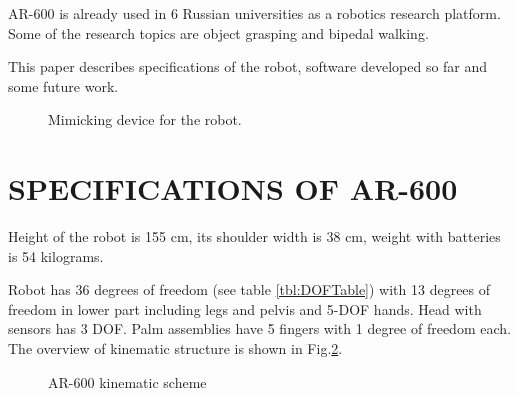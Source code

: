 \documentclass[letterpaper, 10 pt, conference]{ieeeconf}  %
\begin{document}
AR-600 is already used in 6 Russian universities as a robotics research
platform. Some of the research topics are object grasping and bipedal walking.

This paper describes specifications of the robot, software developed so far and
some future work.

\begin{figure} [thpb]
      \centering
      \caption{Mimicking device for the robot.}
      \label{img:suit}
\end{figure}

\section{SPECIFICATIONS OF AR-600}

Height of the robot is 155 cm, its shoulder width is 38 cm, weight with
batteries is 54 kilograms.

Robot has 36 degrees of freedom (see table \ref{tbl:DOFTable}) with 13 degrees
of freedom in lower part including legs and pelvis and 5-DOF hands. Head with sensors has 3 DOF. Palm assemblies have 5
fingers with 1 degree of freedom each.
The overview of kinematic structure is shown in Fig.\ref{img:kinematic}.

 \begin{figure}[thpb]
      \centering
      \caption{AR-600 kinematic scheme}
      \label{img:kinematic}
   \end{figure}
 
\end{document}
